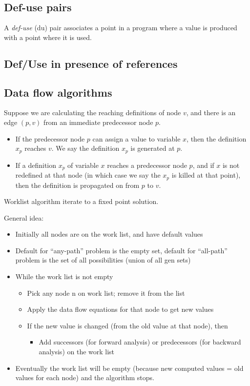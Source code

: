 \documentclass{article}
\begin{document}
\subsection{Def-use pairs} 
A \emph{def-use} (du) pair associates a point in a program where a value is produced with a point where it is used.

\subsection{Def/Use in presence of references}
\subsection{Data flow algorithms}
Suppose we are calculating the reaching definitions of node $v$, and there is an edge $(p, v)$ from an immediate predecessor node $p$.
\begin{itemize}[nosep]
    \item If the predecessor node $p$ can assign a value to variable $x$, then the definition $x_p$ reaches $v$.  We say the definition $x_p$ is generated at $p$.
    \item If a definition $x_p$ of variable $x$ reaches a predecessor node $p$, and if $x$ is not redefined at that node (in which case we say the $x_p$ is killed
	  at that point), then the definition is propagated on from $p$ to $v$.
\end{itemize}

Worklist algorithm iterate to a fixed point solution.

General idea: 
\begin{itemize}
    \item Initially all nodes are on the work list, and have default values 
    \item Default for ``any-path'' problem is the empty set, default for ``all-path'' problem is the set of all possibilities (union of all gen sets)
    \item While the work list is not empty
    \begin{itemize}
	    \item Pick any node n on work list; remove it from the list
        \item Apply the data flow equations for that node to get new values
        \item If the new value is changed (from the old value at that node), then 
        \begin{itemize}
		    \item Add successors (for forward analysis) or predecessors (for backward analysis) on the work list
		\end{itemize}
	\end{itemize}
    \item Eventually the work list will be empty (because new computed values = old values for each node) and the algorithm stops.
\end{itemize}
\end{document}
